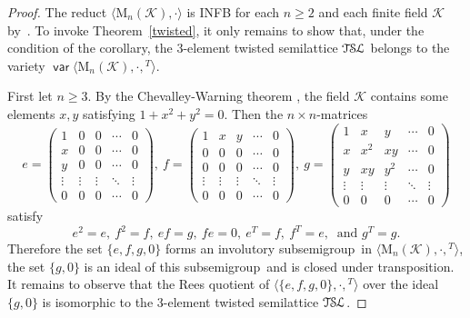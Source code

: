 \documentclass[11pt,reqno]{amsart}
\newcommand{\sgp}{semi\-group}
\newcommand{\TSL}{\ensuremath{\mathcal{T\kern-.5pt S\kern-.5pt L}}}
\DeclareMathOperator{\var}{\mathsf{var}}
\begin{document}
\begin{proof}
The reduct $\langle\mathrm{M}_n(\mathcal{K}),\cdot\rangle$ is INFB for each $n\ge2$ and each finite field $\mathcal{K}$
by~\cite[Corollary~6.2]{sapirburnside}. To invoke Theorem~\ref{twisted}, it only remains to show that, under the condition of the
corollary, the 3-element twisted semilattice $\TSL$ belongs to the variety $\var\langle\mathrm{M}_n(\mathcal{K}),\cdot,{}^T\rangle$.

First let $n\ge3$. By the Chevalley-Warning theorem \cite[Corollary~2 in \S1.2]{Serre}, the field $\mathcal{K}$ contains some elements
$x,y$ satisfying $1+x^2+y^2=0$. Then the $n\times n$-matrices
$$e=\begin{pmatrix}
1 & 0 & 0 & \cdots & 0\\
x & 0 & 0 & \cdots & 0\\
y & 0 & 0 & \cdots & 0\\
\vdots & \vdots & \vdots &\ddots & \vdots\\
0 & 0 & 0 & \cdots & 0
\end{pmatrix},\  f=
\begin{pmatrix} 1 & x & y & \cdots & 0\\
0 & 0 & 0 & \cdots & 0\\
0 & 0 & 0 & \cdots & 0\\
\vdots & \vdots & \vdots &\ddots & \vdots\\
0 & 0 & 0 & \cdots & 0
\end{pmatrix},\
g=
\begin{pmatrix} 1 & x & y & \cdots & 0\\
x & x^2 & xy & \cdots & 0\\
y & xy & y^2 & \cdots & 0\\
\vdots & \vdots & \vdots &\ddots & \vdots\\
0 & 0 & 0 & \cdots & 0
\end{pmatrix}$$
satisfy
$$e^2=e,\ f^2=f,\ ef=g,\ fe=0,\ e^T=f,\ f^T=e,\ \text{ and } g^T=g.$$
Therefore the set $\{e,f,g,0\}$ forms an involutory sub\sgp\ in $\langle\mathrm{M}_n(\mathcal{K}),\cdot,{}^T\rangle$, the set $\{g,0\}$ is
an ideal of this sub\sgp\ and is closed under transposition. It remains to observe that the Rees quotient of
$\langle\{e,f,g,0\},\cdot,{}^T\rangle$ over the ideal $\{g,0\}$ is isomorphic to the 3-element twisted semilattice $\TSL$.


\end{proof}
\end{document}
